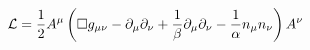 \begin{equation}
\mathcal{L}=\frac{1}{2}A^{\mu }\left( \square g_{\mu \nu }-\partial _{\mu
}\partial _{\nu }+\frac{1}{\beta }\partial _{\mu }\partial _{\nu }-\frac{1}{%
\alpha }n_{\mu }n_{\nu }\right) A^{\nu }  \label{5}
\end{equation}

